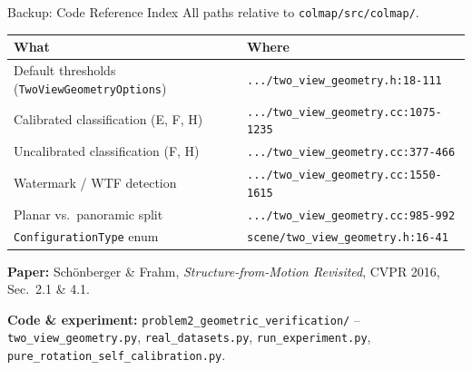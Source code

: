 \documentclass[11pt]{beamer}
\begin{document}
\begin{frame}{Backup: Code Reference Index}
  \footnotesize
  All paths relative to \texttt{colmap/src/colmap/}.
  \vspace{0.1cm}

  \scriptsize
  \begin{tabular}{p{4.3cm}l}
    \toprule
    \textbf{What} & \textbf{Where} \\
    \midrule
    Default thresholds (\texttt{TwoViewGeometryOptions}) & \texttt{.../two\_view\_geometry.h:18-111} \\
    Calibrated classification (E, F, H) & \texttt{.../two\_view\_geometry.cc:1075-1235} \\
    Uncalibrated classification (F, H) & \texttt{.../two\_view\_geometry.cc:377-466} \\
    Watermark / WTF detection & \texttt{.../two\_view\_geometry.cc:1550-1615} \\
    Planar vs.\ panoramic split & \texttt{.../two\_view\_geometry.cc:985-992} \\
    \texttt{ConfigurationType} enum & \texttt{scene/two\_view\_geometry.h:16-41} \\
    \bottomrule
  \end{tabular}
  \vspace{0.3cm}

  \textbf{Paper:} Sch\"onberger \& Frahm, \emph{Structure-from-Motion Revisited}, CVPR 2016,
  Sec.~2.1 \& 4.1.

  \textbf{Code \& experiment:} \texttt{problem2\_geometric\_verification/} --
  \texttt{two\_view\_geometry.py}, \texttt{real\_datasets.py}, \texttt{run\_experiment.py},
  \texttt{pure\_rotation\_self\_calibration.py}.
\end{frame}
\end{document}
